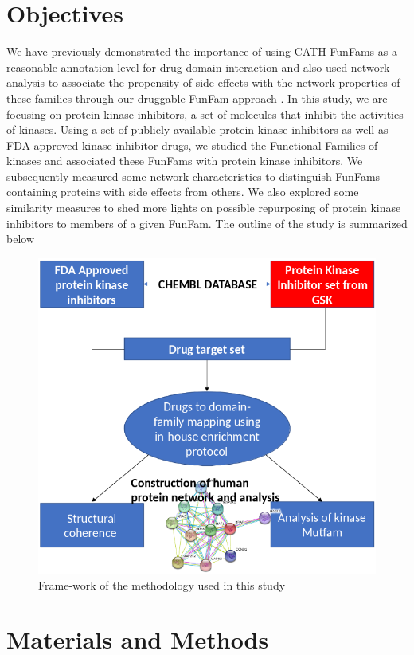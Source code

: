 \documentclass[a4paper, 11pt]{report}
\newcommand{\redcomment}[1]{\textcolor{red}{[#1]}} %
\begin{document}
\newpage
\section*{Objectives}
We have previously demonstrated the importance of using CATH-FunFams as a reasonable annotation level for drug-domain interaction and also used network analysis to associate the propensity of side effects with the network properties of these families through our druggable FunFam approach \cite{moya2017structural}. In this study, we are focusing on protein kinase inhibitors, a set of molecules that inhibit the activities of kinases. Using a set of publicly available protein kinase inhibitors as well as FDA-approved kinase inhibitor drugs, we studied the Functional Families of kinases and associated these FunFams with protein kinase inhibitors. We subsequently measured some network characteristics to distinguish FunFams containing proteins with side effects from others. We also explored some similarity measures to shed more lights on possible repurposing of protein kinase inhibitors to members of a given FunFam.
The outline of the study is summarized below\par
\begin{figure}[H]
	\includegraphics[width=.8\linewidth]{figures/framework.png}
	\centering
	\caption{Frame-work of the methodology used in this study}
	\label{framework}
\end{figure}

\section{Materials and Methods}
\end{document}

